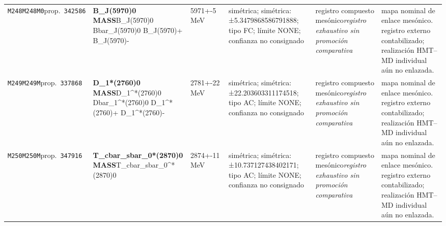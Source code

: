 \begin{landscape}
\begin{longtable}{L{1.85cm}L{4.45cm}L{2.35cm}L{4.05cm}L{3.35cm}L{7.15cm}}
\texttt{M248}\newline \texttt{M248M0}\newline prop.\ \texttt{342586} & \textbf{B\_\allowbreak{}J(5970)0 MASS}\newline B\_\allowbreak{}J(5970)0 \textbar{}\allowbreak{} Bbar\_\allowbreak{}J(5970)0 \textbar{}\allowbreak{} B\_\allowbreak{}J(5970)+ \textbar{}\allowbreak{} B\_\allowbreak{}J(5970)- & 5971+-5\,MeV & simétrica; simétrica: ±5.3479868586791888; tipo FC; límite NONE; confianza no consignado & registro compuesto mesónico\newline \emph{registro exhaustivo sin promoción comparativa} & mapa nominal de enlace mesónico. registro externo contabilizado; realización HMT--MD individual aún no enlazada. \\
\texttt{M249}\newline \texttt{M249M}\newline prop.\ \texttt{337868} & \textbf{D\_\allowbreak{}1*(2760)0 MASS}\newline D\_\allowbreak{}1\textasciicircum{}*(2760)0 \textbar{}\allowbreak{} Dbar\_\allowbreak{}1\textasciicircum{}*(2760)0 \textbar{}\allowbreak{} D\_\allowbreak{}1\textasciicircum{}*(2760)+ \textbar{}\allowbreak{} D\_\allowbreak{}1\textasciicircum{}*(2760)- & 2781+-22\,MeV & simétrica; simétrica: ±22.203603311174518; tipo AC; límite NONE; confianza no consignado & registro compuesto mesónico\newline \emph{registro exhaustivo sin promoción comparativa} & mapa nominal de enlace mesónico. registro externo contabilizado; realización HMT--MD individual aún no enlazada. \\
\texttt{M250}\newline \texttt{M250M}\newline prop.\ \texttt{347916} & \textbf{T\_\allowbreak{}cbar\_\allowbreak{}sbar\_\allowbreak{}0*(2870)0 MASS}\newline T\_\allowbreak{}cbar\_\allowbreak{}sbar\_\allowbreak{}0\textasciicircum{}*(2870)0 & 2874+-11\,MeV & simétrica; simétrica: ±10.737127438402171; tipo AC; límite NONE; confianza no consignado & registro compuesto mesónico\newline \emph{registro exhaustivo sin promoción comparativa} & mapa nominal de enlace mesónico. registro externo contabilizado; realización HMT--MD individual aún no enlazada. \\

\end{longtable}
\end{landscape}
